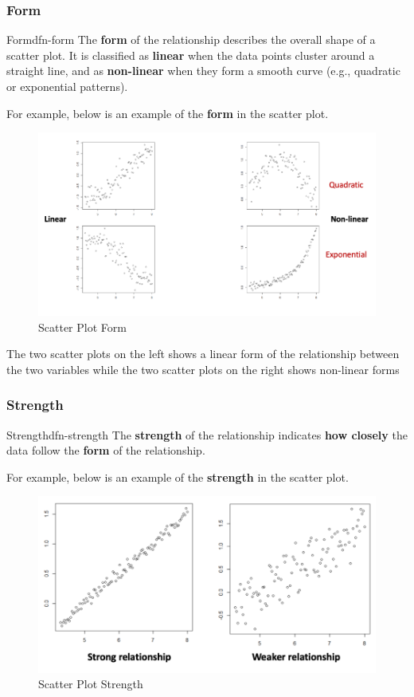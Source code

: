 \documentclass[math,code]{amznotes}
\theoremstyle{remark}
\begin{document}
\subsubsection{Form}
\begin{dfnbox}{Form}{dfn-form}
    The {\color{red} \textbf{form}} of the relationship describes the overall shape of a scatter plot. It is classified as \textbf{linear} when the data points cluster around a straight line, and as \textbf{non-linear} when they form a smooth curve (e.g., quadratic or exponential patterns).
\end{dfnbox}
For example, below is an example of the \textbf{form} in the scatter plot.
\begin{figure}[H]
    \centering
    \includegraphics[width=0.75\linewidth]{images/chapter3-scatter-plot-form.png}
    \caption{Scatter Plot Form}
    \label{fig:chapter3-scatter-plot-form}
\end{figure}
The two scatter plots on the left shows a linear form of the relationship between the two variables while the two scatter plots on the right shows non-linear forms
\subsubsection{Strength}
\begin{dfnbox}{Strength}{dfn-strength}
    The {\color{red} \textbf{strength}} of the relationship indicates \textbf{how closely} the data follow the \textbf{form} of the relationship.
\end{dfnbox}
For example, below is an example of the \textbf{strength} in the scatter plot.
\begin{figure}[H]
    \centering
    \includegraphics[width=0.7\linewidth]{images/chapter3-scatter-plot-strength.png}
    \caption{Scatter Plot Strength}
    \label{fig:chapter3-scatter-plot-strength}
\end{figure}
\end{document}
